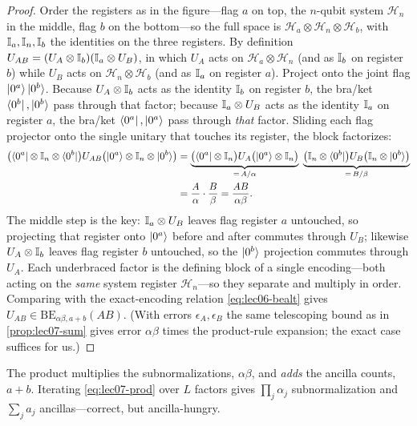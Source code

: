 \begin{proof}
Order the registers as in the figure---flag $a$ on top, the $n$-qubit system
$\mathcal H_n$ in the middle, flag $b$ on the bottom---so the full space is
$\mathcal H_a\otimes\mathcal H_n\otimes\mathcal H_b$, with $\mathbb{I}_a,\mathbb{I}_n,\mathbb{I}_b$ the
identities on the three registers. By definition
$U_{AB}=(U_A\otimes\mathbb{I}_b)(\mathbb{I}_a\otimes U_B)$, in which $U_A$ acts on
$\mathcal H_a\otimes\mathcal H_n$ (and as $\mathbb{I}_b$ on register $b$) while $U_B$ acts on
$\mathcal H_n\otimes\mathcal H_b$ (and as $\mathbb{I}_a$ on register $a$). Project onto the joint
flag $\ket{0^a}\ket{0^b}$. Because $U_A\otimes\mathbb{I}_b$ acts as the identity $\mathbb{I}_b$ on
register $b$, the bra/ket $\bra{0^b},\ket{0^b}$ pass through that factor; because
$\mathbb{I}_a\otimes U_B$ acts as the identity $\mathbb{I}_a$ on register $a$, the bra/ket
$\bra{0^a},\ket{0^a}$ pass through \emph{that} factor. Sliding each flag projector onto
the single unitary that touches its register, the block factorizes:
\begin{align}
  \bigl(\bra{0^a}\otimes\mathbb{I}_n\otimes\bra{0^b}\bigr)U_{AB}
  \bigl(\ket{0^a}\otimes\mathbb{I}_n\otimes\ket{0^b}\bigr)
  &=\underbrace{\bigl(\bra{0^a}\otimes\mathbb{I}_n\bigr)U_A\bigl(\ket{0^a}\otimes\mathbb{I}_n\bigr)}
     _{=\,A/\alpha}\;
    \underbrace{\bigl(\mathbb{I}_n\otimes\bra{0^b}\bigr)U_B\bigl(\mathbb{I}_n\otimes\ket{0^b}\bigr)}
     _{=\,B/\beta}\notag\\
  &=\frac{A}{\alpha}\cdot\frac{B}{\beta}=\frac{AB}{\alpha\beta}.
  \label{eq:lec07-prodblock}
\end{align}
The middle step is the key: $\mathbb{I}_a\otimes U_B$ leaves flag register $a$ untouched, so
projecting that register onto $\ket{0^a}$ before and after commutes through $U_B$;
likewise $U_A\otimes\mathbb{I}_b$ leaves flag register $b$ untouched, so the $\ket{0^b}$
projection commutes through $U_A$. Each underbraced factor is the defining block of a
single encoding---both acting on the \emph{same} system register $\mathcal H_n$---so they
separate and multiply in order. Comparing with the exact-encoding relation
\eqref{eq:lec06-bealt} gives $U_{AB}\in\mathrm{BE}_{\alpha\beta,a+b}(AB)$. (With
errors $\epsilon_A,\epsilon_B$ the same telescoping bound as in
\cref{prop:lec07-sum} gives error $\alpha\beta$ times the product-rule expansion; the
exact case suffices for us.)
\end{proof}

The product multiplies the subnormalizations, $\alpha\beta$, and \emph{adds} the
ancilla counts, $a+b$. Iterating \eqref{eq:lec07-prod} over $L$ factors gives
$\prod_{j}\alpha_j$ subnormalization and $\sum_j a_j$ ancillas---correct, but
ancilla-hungry.

